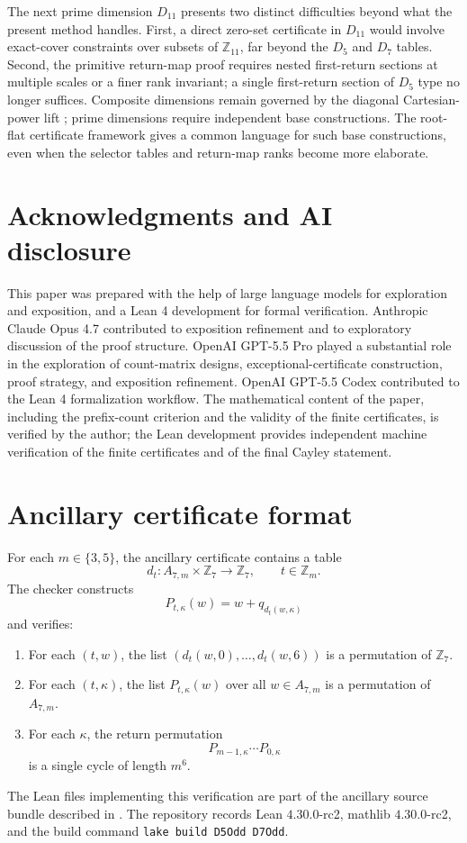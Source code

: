 \documentclass[11pt]{article}
\theoremstyle{definition}
\begin{document}
The next prime dimension \(D_{11}\) presents two distinct difficulties beyond what the present method handles.  First, a direct zero-set certificate in
\(D_{11}\) would involve exact-cover constraints over subsets of \(\mathbb Z_{11}\), far beyond the
\(D_5\) and \(D_7\) tables.  Second, the primitive return-map proof requires nested first-return sections at multiple scales or a finer rank invariant; a single first-return section of \(D_5\) type no longer suffices.  Composite dimensions remain governed by the diagonal Cartesian-power lift
\cite{ParkComposite}; prime dimensions require independent base constructions.  The root-flat certificate framework gives a common language for such base constructions, even when the selector tables and return-map ranks become more elaborate.

\section*{Acknowledgments and AI disclosure}

This paper was prepared with the help of large language models for exploration and exposition, and a Lean 4 development for formal verification.  Anthropic Claude Opus 4.7
contributed to exposition refinement and to exploratory discussion of the proof structure.  OpenAI GPT-5.5 Pro played a substantial role in the exploration of count-matrix designs, exceptional-certificate construction, proof strategy, and exposition refinement.  OpenAI
GPT-5.5 Codex contributed to the Lean 4 formalization workflow.  The mathematical content of the
paper, including the prefix-count criterion and the validity of the finite certificates, is verified by the
author; the Lean development provides independent machine verification of the finite certificates and of
the final Cayley statement.

\appendix

\section{Ancillary certificate format}\label{app:certificate-format}

For each \(m\in\{3,5\}\), the ancillary certificate contains a table
\[
d_t:A_{7,m}\times\mathbb Z_7\to\mathbb Z_7,
\qquad t\in\mathbb Z_m.
\]
The checker constructs
\[
P_{t,\kappa}(w)=w+q_{d_t(w,\kappa)}
\]
and verifies:
\begin{enumerate}[label=(C\arabic*)]
\item For each \((t,w)\), the list \((d_t(w,0),\ldots,d_t(w,6))\) is a permutation of \(\mathbb Z_7\).
\item For each \((t,\kappa)\), the list \(P_{t,\kappa}(w)\) over all \(w\in A_{7,m}\) is a permutation
of \(A_{7,m}\).
\item For each \(\kappa\), the return permutation
\[
P_{m-1,\kappa}\cdots P_{0,\kappa}
\]
is a single cycle of length \(m^6\).
\end{enumerate}
The Lean files implementing this verification are part of the ancillary source bundle described in
\cite{TorusProgram}.  The repository records Lean \(4.30.0\)-rc2, mathlib \(4.30.0\)-rc2, and the build
command \texttt{lake build D5Odd D7Odd}.
\end{document}
